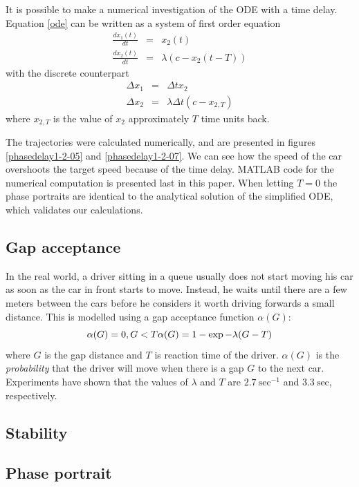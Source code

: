 \documentclass[11pt,a4paper]{article}
\begin{document}
It is possible to make a numerical investigation of the ODE with a time delay.
Equation \ref{ode} can be written as a system of first order equation
\begin{eqnarray*}
\frac{dx_1(t)}{dt} &=& x_2(t) \\
\frac{dx_2(t)}{dt} &=& \lambda \left( c - x_2(t-T) \right)
\end{eqnarray*}
with the discrete counterpart
\begin{eqnarray*}
\Delta x_1 &=& \Delta t x_2 \\
\Delta x_2 &=& \lambda \Delta t ( c - x_{2,T})
\end{eqnarray*}
where $x_{2,T}$ is the value of $x_2$ approximately $T$ time units back.

The trajectories were calculated numerically, and are presented in figures
\ref{phasedelay1-2-05} and \ref{phasedelay1-2-07}. We can see how the speed of
the car overshoots the target speed because of the time delay. MATLAB code for
the numerical computation is presented last in this paper. When letting $T=0$
the phase portraits are identical to the analytical solution of the simplified
ODE, which validates our calculations.

\subsection{Gap acceptance}
In the real world, a driver sitting in a queue usually does not start moving his car as
soon as the car in front starts to move. Instead, he waits until there are a few meters
between the cars before he considers it worth driving forwards a small distance.
This is modelled using a gap acceptance function $\alpha(G)$:
\[ \alpha(G) = 0, G < T\\
\alpha(G) = 1 - \exp{-\lambda(G - T)} \]
where $G$ is the gap distance and $T$ is reaction time of the driver.  %
$\alpha(G)$ is the \emph{probability} that the driver will move when there is a gap $G$
to the next car. Experiments have shown that the values of $\lambda$ and $T$ are $2.7~\mbox{sec}^{-1}$
and $3.3~\mbox{sec}$, respectively.

\subsection{Stability}
\subsection{Phase portrait}
\end{document}
